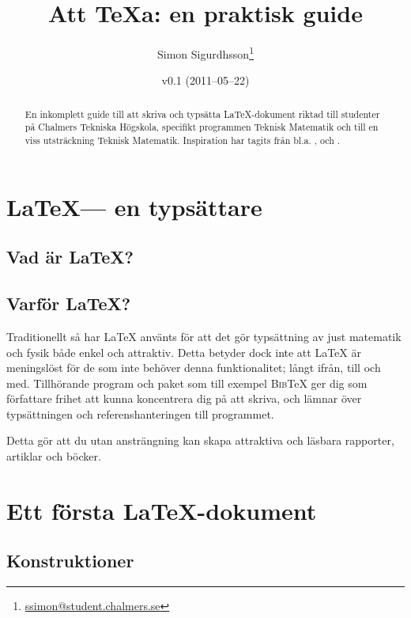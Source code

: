 \documentclass[11pt]{skrapport}
\newcommand\BibTeX{\textsc{Bib}\TeX}
\begin{document}
	\begin{titlepage} %
		\title{Att \TeX{}a: en praktisk guide}
		\author{Simon Sigurdhsson\thanks{\url{ssimon@student.chalmers.se}}}
		\date{v0.1 (2011--05--22)}
		\maketitle
		\begin{abstract}
			En inkomplett guide till att skriva och typsätta \LaTeX-dokument riktad
			till studenter på Chalmers Tekniska Högskola, specifikt programmen
			Teknisk Matematik och till en viss utsträckning Teknisk Matematik.
			Inspiration har tagits från bl.a. ,
			 och .
		\end{abstract}
	\end{titlepage} %
	
	\section{\LaTeX --- en typsättare}
	\subsection{Vad är \LaTeX?}
	
	\subsection{Varför \LaTeX?}
	Traditionellt så har \LaTeX{} använts för att det gör typsättning av just
	matematik och fysik både enkel och attraktiv. Detta betyder dock inte att
	\LaTeX{} är meningslöst för de som inte behöver denna funktionalitet; långt
	ifrån, till och med. Tillhörande program och paket som till exempel
	\BibTeX{} ger dig som författare frihet att kunna koncentrera dig på att
	skriva, och lämnar över typsättningen och referenshanteringen till
	programmet.
	
	Detta gör att du utan ansträngning kan skapa attraktiva och läsbara
	rapporter, artiklar och böcker.
	
	\section{Ett första \LaTeX-dokument}
	
	\subsection{Konstruktioner}
	
\end{document}
